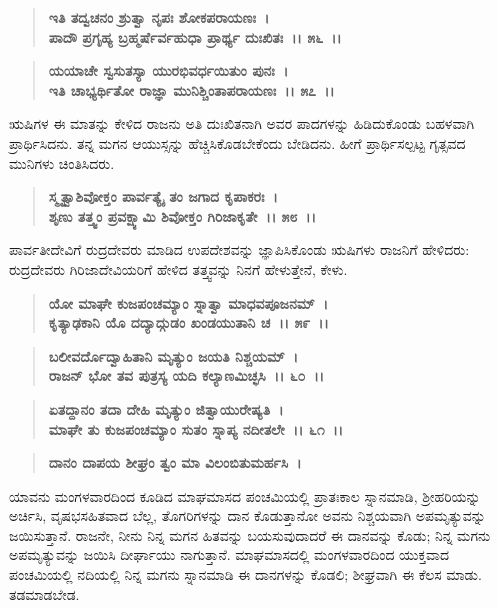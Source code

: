 \begin{verse}
\textbf{ಇತಿ ತದ್ವಚನಂ ಶ್ರುತ್ವಾ ನೃಪಃ ಶೋಕಪರಾಯಣಃ~।}\\\textbf{ಪಾದೌ ಪ್ರಗೃಹ್ಯ ಬ್ರಹ್ಮರ್ಷೆರ್ವಹುಧಾ ಪ್ರಾರ್ಥ್ಯ ದುಃಖಿತಃ~।। ೫೬~।। }
\end{verse}

\begin{verse}
\textbf{ಯಯಾಚೇ ಸ್ವಸುತಸ್ಯಾ ಯುರಭಿವರ್ಧಯಿತುಂ ಪುನಃ~।}\\\textbf{ಇತಿ ಚಾಭ್ಯರ್ಥಿತೋ ರಾಜ್ಞಾ ಮುನಿಶ್ಚಿಂತಾಪರಾಯಣಃ~।। ೫೭~।।}
\end{verse}

ಋಷಿಗಳ ಈ ಮಾತನ್ನು ಕೇಳಿದ ರಾಜನು ಅತಿ ದುಃಖಿತನಾಗಿ ಅವರ ಪಾದಗಳನ್ನು ಹಿಡಿದುಕೊಂಡು ಬಹಳವಾಗಿ ಪ್ರಾರ್ಥಿಸಿದನು. ತನ್ನ ಮಗನ ಆಯುಸ್ಸನ್ನು ಹೆಚ್ಚಿಸಿಕೊಡಬೇಕೆಂದು ಬೇಡಿದನು. ಹೀಗೆ ಪ್ರಾರ್ಥಿಸಲ್ಪಟ್ಟ ಗೃತ್ಸವದ ಮುನಿಗಳು ಚಿಂತಿಸಿದರು.

\begin{verse}
\textbf{ಸ್ಮೃತ್ವಾಶಿವೋಕ್ತಂ ಪಾರ್ವತ್ಯೈ ತಂ ಜಗಾದ ಕೃಪಾಕರಃ~।}\\\textbf{ಶೃಣು ತತ್ತ್ವಂ ಪ್ರವಕ್ಷ್ಯಾಮಿ ಶಿವೋಕ್ತಂ ಗಿರಿಜಾಕೃತೇ~।। ೫೮~।।}
\end{verse}

ಪಾರ್ವತೀದೇವಿಗೆ ರುದ್ರದೇವರು ಮಾಡಿದ ಉಪದೇಶವನ್ನು ಜ್ಞಾಪಿಸಿಕೊಂಡು ಋಷಿಗಳು ರಾಜನಿಗೆ ಹೇಳಿದರು: ರುದ್ರದೇವರು ಗಿರಿಜಾದೇವಿಯರಿಗೆ ಹೇಳಿದ ತತ್ತ್ವವನ್ನು ನಿನಗೆ ಹೇಳುತ್ತೇನೆ, ಕೇಳು.

\begin{verse}
\textbf{ಯೋ ಮಾಘೇ ಕುಜಪಂಚಮ್ಯಾಂ ಸ್ನಾತ್ವಾ ಮಾಧವಪೂಜನಮ್~।}\\\textbf{ಕೃತ್ಯಾಢಕಾನಿ ಯೊ ದದ್ಯಾದ್ಗುಡಂ ಖಂಡಯುತಾನಿ ಚ~।। ೫೯~।।} 
\end{verse}

\begin{verse}
\textbf{ಬಲೀವರ್ದೊದ್ವಾಹಿತಾನಿ ಮೃತ್ಯುಂ ಜಯತಿ ನಿಶ್ಚಯಮ್~।}\\\textbf{ರಾಜನ್ ಭೋ ತವ ಪುತ್ರಸ್ಯ ಯದಿ ಕಲ್ಯಾಣಮಿಚ್ಛಸಿ~।। ೬೦~।। }
\end{verse}

\begin{verse}
\textbf{ಏತದ್ದಾನಂ ತದಾ ದೇಹಿ ಮೃತ್ಯುಂ ಜಿತ್ವಾಯುರೇಷ್ಯತಿ~।}\\\textbf{ಮಾಘೇ ತು ಕುಜಪಂಚಮ್ಯಾಂ ಸುತಂ ಸ್ನಾಪ್ಯ ನದೀತಲೇ~।। ೬೧~।। }
\end{verse}

\begin{verse}
\textbf{ದಾನಂ ದಾಪಯ ಶೀಘ್ರಂ ತ್ವಂ ಮಾ ವಿಲಂಬಿತುಮರ್ಹಸಿ~।}
\end{verse}

ಯಾವನು ಮಂಗಳವಾರದಿಂದ ಕೂಡಿದ ಮಾಘಮಾಸದ ಪಂಚಮಿಯಲ್ಲಿ ಪ್ರಾತಃಕಾಲ ಸ್ನಾನಮಾಡಿ, ಶ‍್ರೀಹರಿಯನ್ನು ಅರ್ಚಿಸಿ, ವೃಷಭಸಹಿತವಾದ ಬೆಲ್ಲ, ತೊಗರಿಗಳನ್ನು ದಾನ ಕೊಡುತ್ತಾನೋ ಅವನು ನಿಶ್ಚಯವಾಗಿ ಅಪಮೃತ್ಯುವನ್ನು ಜಯಿಸುತ್ತಾನೆ. ರಾಜನೇ, ನೀನು ನಿನ್ನ ಮಗನ ಹಿತವನ್ನು ಬಯಸುವುದಾದರೆ ಈ ದಾನವನ್ನು ಕೊಡು; ನಿನ್ನ ಮಗನು ಅಪಮೃತ್ಯುವನ್ನು ಜಯಿಸಿ ದೀರ್ಘಾಯು ನಾಗುತ್ತಾನೆ. ಮಾಘಮಾಸದಲ್ಲಿ ಮಂಗಳವಾರದಿಂದ ಯುಕ್ತವಾದ ಪಂಚಮಿಯಲ್ಲಿ ನದಿಯಲ್ಲಿ ನಿನ್ನ ಮಗನು ಸ್ನಾನಮಾಡಿ ಈ ದಾನಗಳನ್ನು ಕೊಡಲಿ; ಶೀಘ್ರವಾಗಿ ಈ ಕೆಲಸ ಮಾಡು. ತಡಮಾಡಬೇಡ.

